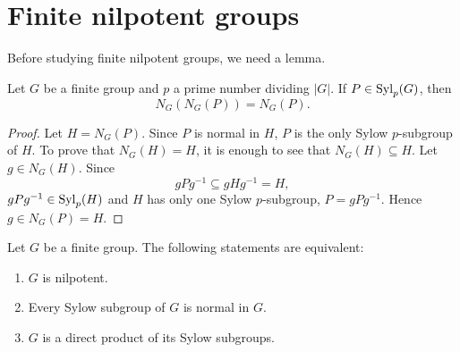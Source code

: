 

\section{Finite nilpotent groups}

Before studying finite nilpotent groups, we need a lemma. 

\begin{lemma}
\label{lem:normalizador}
Let $G$ be a finite group and $p$ a prime number dividing $|G|$. 
If 
$P\in\mathrm{Syl}_p(G)$, then 
\[
N_G(N_G(P))=N_G(P). 
\]
\end{lemma}

\begin{proof}
Let $H=N_G(P)$. Since $P$ is normal in $H$, $P$ is the only Sylow $p$-subgroup of $H$. 
To prove that $N_G(H)=H$, it is enough to see that $N_G(H)\subseteq
H$. Let $g\in N_G(H)$. Since  
\[
gPg^{-1}\subseteq gHg^{-1}=H,
\]
$gPg^{-1}\in\mathrm{Syl}_p(H)$ and $H$ has only one Sylow $p$-subgroup, 
$P=gPg^{-1}$.  Hence $g\in N_G(P)=H$. 
\end{proof}

\begin{theorem}
\label{thm:nilpotent:eq}
Let $G$ be a finite group. The following statements are equivalent:
\begin{enumerate}
	\item $G$ is nilpotent. 
	\item Every Sylow subgroup of $G$ is normal in $G$. 
	\item $G$ is a direct product of its Sylow subgroups. 
\end{enumerate}
\end{theorem}

